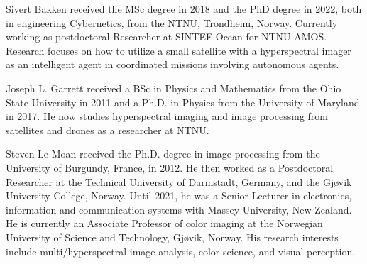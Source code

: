 
\begin{IEEEbiography}
{Sivert Bakken}
received the MSc degree in 2018 and the PhD degree in 2022, both in engineering Cybernetics, from the NTNU, Trondheim,
Norway. Currently working as postdoctoral Researcher at SINTEF Ocean for NTNU AMOS. Research focuses on how to utilize a small satellite with a hyperspectral imager as an intelligent agent in coordinated missions involving autonomous agents. 
\end{IEEEbiography}


\begin{IEEEbiography}{Joseph L. Garrett}
received a BSc in Physics and Mathematics from the Ohio State University in 2011 and a Ph.D. in Physics from the University of Maryland in 2017. He now studies hyperspectral imaging and image processing from satellites and drones as a researcher at NTNU. 
\end{IEEEbiography}

\begin{IEEEbiography}{Steven Le Moan}
received the Ph.D. degree in image processing from the University of Burgundy, France, in 2012. He then worked as a Postdoctoral Researcher at the Technical University of Darmstadt, Germany, and the Gjøvik University College, Norway. Until 2021, he was a Senior Lecturer in electronics, information and communication systems with Massey University, New Zealand. He is currently an Associate Professor of color imaging at the Norwegian University of Science and Technology, Gjøvik, Norway. His research interests include multi/hyperspectral image analysis, color science, and visual perception.
\end{IEEEbiography}


